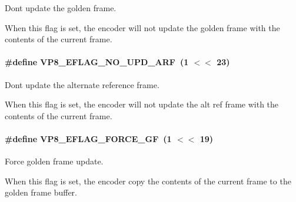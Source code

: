 Don\textquotesingle{}t update the golden frame. 

When this flag is set, the encoder will not update the golden frame with the contents of the current frame. 
\paragraph[{\texorpdfstring{V\+P8\+\_\+\+E\+F\+L\+A\+G\+\_\+\+N\+O\+\_\+\+U\+P\+D\+\_\+\+A\+RF}{VP8_EFLAG_NO_UPD_ARF}}]{\setlength{\rightskip}{0pt plus 5cm}\#define V\+P8\+\_\+\+E\+F\+L\+A\+G\+\_\+\+N\+O\+\_\+\+U\+P\+D\+\_\+\+A\+RF~(1 $<$$<$ 23)}\hypertarget{group__vp8__encoder_ga1cff46a5287e73a620660030d40b9e6c}{}\label{group__vp8__encoder_ga1cff46a5287e73a620660030d40b9e6c}


Don\textquotesingle{}t update the alternate reference frame. 

When this flag is set, the encoder will not update the alt ref frame with the contents of the current frame. 
\paragraph[{\texorpdfstring{V\+P8\+\_\+\+E\+F\+L\+A\+G\+\_\+\+F\+O\+R\+C\+E\+\_\+\+GF}{VP8_EFLAG_FORCE_GF}}]{\setlength{\rightskip}{0pt plus 5cm}\#define V\+P8\+\_\+\+E\+F\+L\+A\+G\+\_\+\+F\+O\+R\+C\+E\+\_\+\+GF~(1 $<$$<$ 19)}\hypertarget{group__vp8__encoder_gacb64c00adcb361f72a9a3028eb12f5ff}{}\label{group__vp8__encoder_gacb64c00adcb361f72a9a3028eb12f5ff}


Force golden frame update. 

When this flag is set, the encoder copy the contents of the current frame to the golden frame buffer. 
